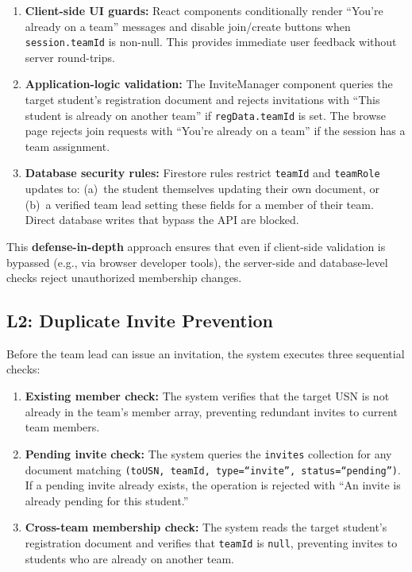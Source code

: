 \documentclass[conference]{IEEEtran}
\begin{document}
\begin{enumerate}[noitemsep,topsep=3pt]
    \item \textbf{Client-side UI guards:} React components conditionally render ``You're already on a team'' messages and disable join/create buttons when \texttt{session.teamId} is non-null. This provides immediate user feedback without server round-trips.
    \item \textbf{Application-logic validation:} The InviteManager component queries the target student's registration document and rejects invitations with ``This student is already on another team'' if \texttt{regData.teamId} is set. The browse page rejects join requests with ``You're already on a team'' if the session has a team assignment.
    \item \textbf{Database security rules:} Firestore rules restrict \texttt{teamId} and \texttt{teamRole} updates to: (a)~the student themselves updating their own document, or (b)~a verified team lead setting these fields for a member of their team. Direct database writes that bypass the API are blocked.
\end{enumerate}

This \textbf{defense-in-depth} approach ensures that even if client-side validation is bypassed (e.g., via browser developer tools), the server-side and database-level checks reject unauthorized membership changes.

\subsection{L2: Duplicate Invite Prevention}

Before the team lead can issue an invitation, the system executes three sequential checks:

\begin{enumerate}[noitemsep,topsep=3pt]
    \item \textbf{Existing member check:} The system verifies that the target USN is not already in the team's member array, preventing redundant invites to current team members.
    \item \textbf{Pending invite check:} The system queries the \texttt{invites} collection for any document matching \texttt{(toUSN, teamId, type=``invite'', status=``pending'')}. If a pending invite already exists, the operation is rejected with ``An invite is already pending for this student.''
    \item \textbf{Cross-team membership check:} The system reads the target student's registration document and verifies that \texttt{teamId} is \texttt{null}, preventing invites to students who are already on another team.
\end{enumerate}
\end{document}
